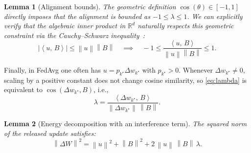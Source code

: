 \documentclass{article}
\theoremstyle{plain}
\newtheorem{lemma}{Lemma}
\theoremstyle{definition}
\theoremstyle{remark}
\numberwithin{theorem}{section}
\numberwithin{definition}{section}
\numberwithin{remark}{section}
\numberwithin{lemma}{section}
\numberwithin{assumption}{section}
\newcommand{\R}{\mathbb{R}}
\newcommand{\ip}[2]{\left\langle #1,\,#2 \right\rangle}
\newcommand{\norm}[1]{\left\lVert #1 \right\rVert}
\newcommand{\tindex}{k^\star}
\newcommand{\utarget}{u}
\begin{document}
\begin{lemma}[Alignment bounds]
\label{prop:lambda_bounds}
The geometric definition $\cos(\theta) \in [-1, 1]$ directly imposes that the alignment is bounded as $-1 \le \lambda \le 1$. We can explicitly verify that the algebraic inner product in $\R^d$ naturally respects this geometric constraint via the Cauchy--Schwarz inequality~\cite{steele2004cauchy}:
\begin{equation*}
\big|\ip{\utarget}{B}\big| \le \norm{\utarget}\norm{B} \quad \implies \quad -1 \le \frac{\ip{\utarget}{B}}{\norm{\utarget}\norm{B}} \le 1.
\end{equation*}
\end{lemma}

Finally, in FedAvg one often has $\utarget = p_{\tindex}\Delta w_{\tindex}$ with $p_{\tindex}>0$.
Whenever $\Delta w_{\tindex}\neq 0$, scaling by a positive constant does not change cosine similarity,
so \eqref{eq:lambda} is equivalent to $\cos(\Delta w_{\tindex},B)$, i.e.,
\begin{equation}
\lambda
= \frac{\ip{\Delta w_{\tindex}}{B}}{\norm{\Delta w_{\tindex}}\,\norm{B}}.
\end{equation}

\begin{lemma}[Energy decomposition with an interference term]
\label{prop:energy}
The squared norm of the released update satisfies:
\begin{equation}
\label{eq:energy_lambda}
\norm{\Delta W}^2
=
\norm{\utarget}^2 + \norm{B}^2 + 2\,\norm{\utarget}\,\norm{B}\,\lambda.
\end{equation}
\end{lemma}
\end{document}
